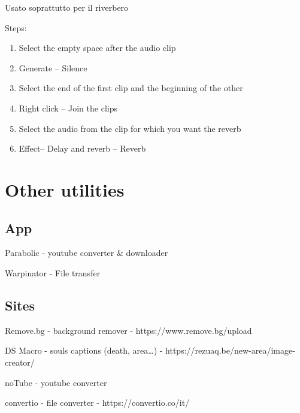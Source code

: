 \documentclass[12pt]{article}
\begin{document}
Usato soprattutto per il riverbero

\vspace{20px}

Steps:
\begin{enumerate}
    \item Select the empty space after the audio clip
    \item Generate -- Silence
    \item Select the end of the first clip and the beginning of the other
    \item Right click -- Join the clips
    \item Select the audio from the clip for which you want the reverb
    \item Effect-- Delay and reverb -- Reverb
\end{enumerate}










\clearpage{}
\section{Other utilities}

\vspace{20px}

\subsection{App}

Parabolic - youtube converter \& downloader 

Warpinator - File transfer


\subsection{Sites}

Remove.bg - background remover - https://www.remove.bg/upload

DS Macro - souls captions (death, area\dots) - https://rezuaq.be/new-area/image-creator/

noTube - youtube converter

convertio - file converter - https://convertio.co/it/
\end{document}
